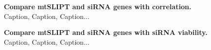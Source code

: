 \begin{figure}[!htp]
\begin{mdframed}
\begin{center}
   \end{center}
   \caption[Compare mtSLIPT and siRNA genes with correlation]{\small \textbf{Compare mtSLIPT and siRNA genes with correlation.} Caption, Caption, Caption...
}
\label{fig:compare_correlation_mtSL}
\end{mdframed}
\end{figure}


\begin{figure}[!htp]
\begin{mdframed}
\begin{center}
   \end{center}
   \caption[Compare mtSLIPT and siRNA genes with siRNA viability]{\small \textbf{Compare mtSLIPT and siRNA genes with siRNA viability.} Caption, Caption, Caption...
}
\label{fig:compare_viability_mtSL}
\end{mdframed}
\end{figure}


